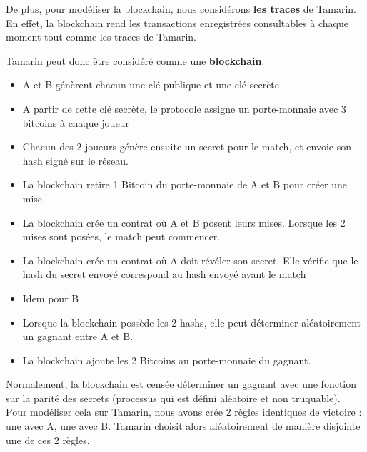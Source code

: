 \documentclass[conference]{IEEEtran}
\begin{document}
De plus, pour modéliser la blockchain, nous considérons \textbf{les traces} de Tamarin. En effet, la blockchain rend les transactions enregistrées consultables à chaque moment tout comme les traces de Tamarin.

Tamarin peut donc être considéré comme une \textbf{blockchain}.


\begin{itemize}
    \item A et B génèrent chacun une clé publique et une clé secrète
    \item A partir de cette clé secrète, le protocole assigne un porte-monnaie avec 3 bitcoins à chaque joueur
    \item Chacun des 2 joueurs génère ensuite un secret pour le match, et envoie son hash signé sur le réseau.
    \item La blockchain retire 1 Bitcoin du porte-monnaie de A et B pour créer une mise
    \item La blockchain crée un contrat où A et B posent leurs mises. Lorsque les 2 mises sont posées, le match peut commencer.
    \item La blockchain crée un contrat où A doit révéler son secret. Elle vérifie que le hash du secret envoyé correspond au hash envoyé avant le match
    \item Idem pour B
    \item Lorsque la blockchain possède les 2 hashs, elle peut déterminer aléatoirement un gagnant entre A et B.
    \item La blockchain ajoute les 2 Bitcoins au porte-monnaie du gagnant.
\end{itemize}
\vspace{0.2cm}
Normalement, la blockchain est censée déterminer un gagnant avec une fonction sur la parité des secrets (processus qui est défini aléatoire et non truquable). \\Pour modéliser cela sur Tamarin, nous avons crée 2 règles identiques de victoire : une avec A, une avec B. Tamarin choisit alors aléatoirement de manière disjointe une de ces 2 règles.\\
\end{document}
